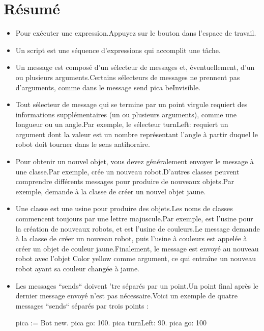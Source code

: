 \documentclass[a4paper,10pt,twoside]{book}
\begin{document}
\section{R\'esum\'e}

\begin{itemize}

\item Pour ex\'ecuter une expression.Appuyez sur le bouton  dans l'espace de travail.
	
\item Un script est une s\'equence d'expressions qui accomplit une t\^ache.

\item Un message est compos\'e d'un s\'electeur de messages et, \'eventuellement, d'un ou plusieurs arguments.Certains s\'electeurs de messages ne prennent pas d'arguments, comme dans le message send pica beInvisible.

\item  Tout s\'electeur de message qui se termine par un point virgule requiert des informations suppl\'ementaires (un ou plusieurs arguments), comme une longueur ou un angle.Par exemple, le s\'electeur turnLeft: requiert un argument dont la valeur est un nombre repr\'esentant l'angle \`a partir duquel le robot doit tourner dans le sens antihoraire.

\item  Pour obtenir un nouvel objet, vous devez g\'en\'eralement envoyer le message  \`a une classe.Par exemple,  cr\'ee un nouveau robot.D'autres classes peuvent comprendre diff\'erents messages pour produire de nouveaux objets.Par exemple,  demande \`a la classe  de cr\'eer un nouvel objet  jaune. 

\item  Une classe est une usine pour produire des objets.Les noms de classes commencent toujours par une lettre majuscule.Par exemple,  est l'usine pour la cr\'eation de nouveaux robots, et  est l'usine de couleurs.Le message  demande \`a la classe  de cr\'eer un nouveau robot, puis l'usine \`a couleurs est appel\'ee \`a cr\'eer un objet de couleur jaune.Finalement, le message  est envoy\'e au nouveau robot avec l'objet Color yellow comme argument, ce qui entra\^ine un nouveau robot ayant sa couleur chang\'ee \`a jaune.

\item  Les messages ``sends`` doivent 'tre s\'epar\'es par un point.Un point final apr\`es le dernier message envoy\'e n'est pas n\'ecessaire.Voici un exemple de quatre messages ``sends`` s\'epar\'es par trois points :
\begin{code}{}
pica := Bot new. 
pica go: 100. 
pica turnLeft: 90. 
pica go: 100 
\end{code}


\end{itemize}
\end{document}
